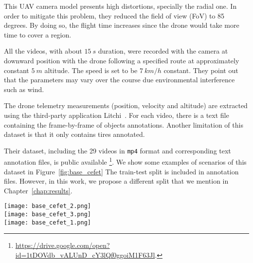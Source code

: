 This UAV camera model presents high distortions, specially the radial one.
In order to mitigate this problem, they reduced the field of view (FoV) to 85 degrees.
By doing so, the flight time increases since the drone would take more time to cover a region.

All the videos, with about $15~s$ duration, were recorded with the camera at downward position with the drone following a specified route at
approximately constant $5~m$ altitude.
The speed is set to be $7~km/h$ constant.
They point out that the parameters may vary over the course due environmental interference such as wind.

The drone telemetry measurements (\eg position, velocity and altitude) are extracted using the third-party application Litchi~\cite{web:litchi}.
For each video, there is a text file containing the frame-by-frame of objects annotations.
Another limitation of this dataset is that it only contains tires annotated.

Their dataset, including the 29 videos in \verb|mp4| format and corresponding text annotation files, is public available
\footnote{\url{https://drive.google.com/open?id=1tDOVdb_vALUnD_cY3lQf0ggoiM1F63Jl}.}.
We show some examples of scenarios of this dataset in Figure~\ref{fig:base_cefet}
The train-test split is included in annotation files.
However, in this work, we propose a different split that we mention in Chapter~\ref{chap:results}.

\begin{figure*}[htb!]
	\centering
	\texttt{[image: base\_cefet\_2.png]}\\
	\vspace{2mm}
	\texttt{[image: base\_cefet\_3.png]}\\
	\vspace{2mm}
	\texttt{[image: base\_cefet\_1.png]}\\
	\caption{Examples of scenarios contemplated by the CEFET dataset.}
	\label{fig:base_cefet}
\end{figure*}


